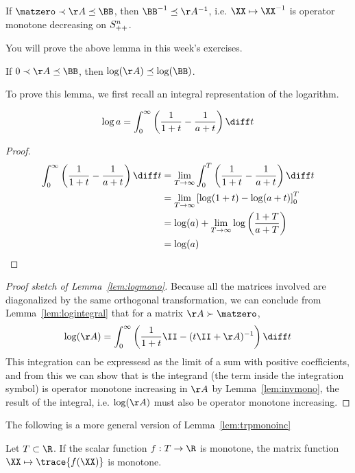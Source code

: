 \begin{lemma}\label{lem:invmono}
  If $\matzero \prec\AA\preceq\BB$, then $\BB^{-1}\preceq \AA^{-1}$, i.e. $\XX
  \mapsto \XX^{-1}$ is operator monotone decreasing on $S_{++}^n$.
\end{lemma}
You will prove the above lemma in this week's exercises.

\begin{lemma}\label{lem:logmono}
  If $0\prec\AA\preceq\BB$, then $\log(\AA)\preceq\log(\BB)$.
\end{lemma}
To prove this lemma, we first recall an integral representation of the
logarithm.
\begin{lemma}
  \label{lem:logintegral}
\[
\log a = \int_0^{\infty} \left(\frac{1}{1+t} -\frac{1}{a+t}  \right)
\diff t
    \]
\end{lemma}
\begin{proof}
  \begin{align*}
\int_0^{\infty} \left(\frac{1}{1+t} -\frac{1}{a+t}  \right) \diff t
    &=
    \lim_{T \to \infty}
      \int_0^{T} \left(\frac{1}{1+t} -\frac{1}{a+t}  \right) \diff t
\\
    &=
    \lim_{T \to \infty}
      \left[ \log(1+t) - \log(a+t) \right]_0^{T}
\\
    &=
      \log(a)
      +
    \lim_{T \to \infty}
      \log\left( \frac{1+T}{a+T} \right)
\\
    &=
      \log(a)
  \end{align*}
\end{proof}
\begin{proof}[Proof sketch of Lemma~\ref{lem:logmono}]
Because all the matrices involved are diagonalized by the same
orthogonal transformation, we can conclude from
Lemma~\ref{lem:logintegral} that for a matrix $\AA \succ \matzero$,
\[
 \log(\AA)
   = \int_0^{\infty} \left(\frac{1}{1+t}\II -(t \II + \AA)^{-1} \right) \diff t
\]
This integration can be expressesd as the limit of a sum with positive
coefficients, and from this we
can show that is the integrand (the term inside the integration
symbol) is operator monotone increasing in $\AA$ by
Lemma~\ref{lem:invmono}, the result of the integral, i.e. $\log(\AA)$
must also be operator monotone increasing.
\end{proof}

The following is a more general version of Lemma~\ref{lem:trpmonoinc}
\begin{lemma}
  Let $T \subset \R$.
  If the scalar function $f : T \to \R$ is monotone, the matrix
  function $\XX \mapsto \trace{f(\XX)}$ is monotone.
\end{lemma}

